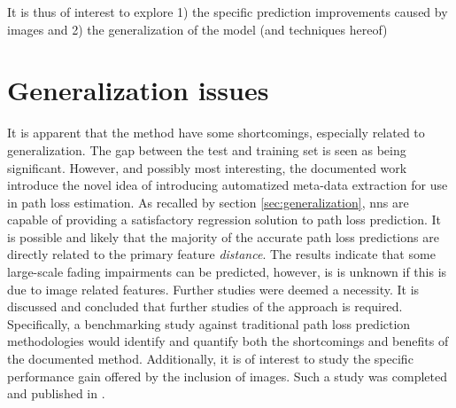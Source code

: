 It is thus of interest to explore 1) the specific prediction improvements caused by images and 2) the generalization of the model (and techniques hereof)

\section{Generalization issues}\label{sec:summary_version1}
It is apparent that the method have some shortcomings, especially related to generalization. The gap between the test and training set is seen as being significant. However, and possibly most interesting, the documented work introduce the novel idea of introducing automatized meta-data extraction for use in path loss estimation.
As recalled by section \ref{sec:generalization}, \glspl{nn} are capable of providing a satisfactory regression solution to path loss prediction. It is possible and likely that the majority of the accurate path loss predictions are directly related to the primary feature \emph{distance}. The results indicate that some large-scale fading impairments can be predicted, however, is is unknown if this is due to image related features. Further studies were deemed a necessity. It is discussed and concluded that further studies of the approach is required. Specifically, a benchmarking study against traditional path loss prediction methodologies would identify and quantify both the shortcomings and benefits of the documented method. Additionally, it is of interest to study the specific performance gain offered by the inclusion of images. Such a study was completed and published in \cite{Thrane020ModelAidedDeepLearning}.  